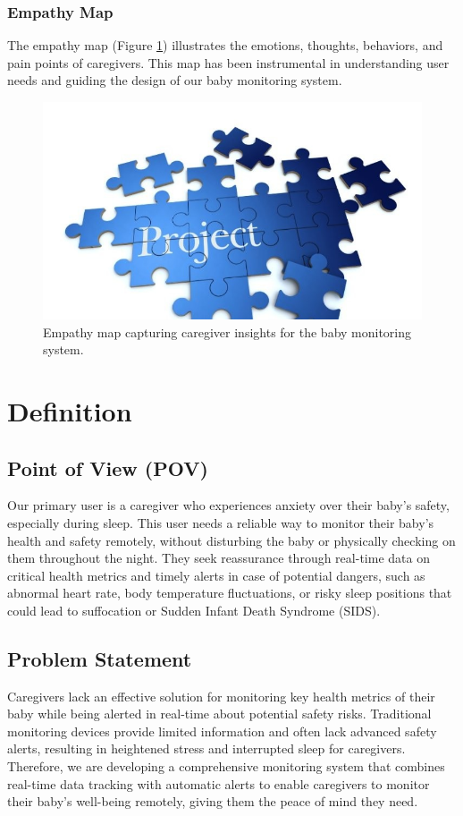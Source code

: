\documentclass[12pt,a4paper]{report}
\begin{document}
\subsection{Empathy Map}
The empathy map (Figure \ref{fig:empathy}) illustrates the emotions, thoughts, behaviors, and pain points of caregivers. This map has been instrumental in understanding user needs and guiding the design of our baby monitoring system.

\begin{figure}[H]
  \centering
  \includegraphics[scale=0.3]{./pic/sample.jpg}
  \caption{Empathy map capturing caregiver insights for the baby monitoring system.}
  \label{fig:empathy}
\end{figure}


\chapter{Definition}
\section{Point of View (POV)}
Our primary user is a caregiver who experiences anxiety over their baby's safety, especially during sleep. This user needs a reliable way to monitor their baby’s health and safety remotely, without disturbing the baby or physically checking on them throughout the night. They seek reassurance through real-time data on critical health metrics and timely alerts in case of potential dangers, such as abnormal heart rate, body temperature fluctuations, or risky sleep positions that could lead to suffocation or Sudden Infant Death Syndrome (SIDS).

\section{Problem Statement}
Caregivers lack an effective solution for monitoring key health metrics of their baby while being alerted in real-time about potential safety risks. Traditional monitoring devices provide limited information and often lack advanced safety alerts, resulting in heightened stress and interrupted sleep for caregivers. Therefore, we are developing a comprehensive monitoring system that combines real-time data tracking with automatic alerts to enable caregivers to monitor their baby’s well-being remotely, giving them the peace of mind they need.
\end{document}
